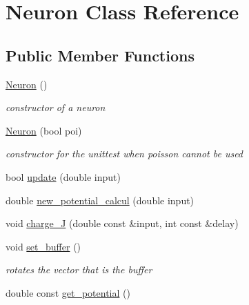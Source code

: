 \hypertarget{class_neuron}{}\section{Neuron Class Reference}
\label{class_neuron}
\subsection*{Public Member Functions}
\begin{DoxyCompactItemize}
\item 
\mbox{\label{class_neuron_a823487d01615fadb8ac19a2768dd9d96}} 
\hyperlink{class_neuron_a823487d01615fadb8ac19a2768dd9d96}{Neuron} ()
\begin{DoxyCompactList}\small\item\em constructor of a neuron \end{DoxyCompactList}\item 
\mbox{\label{class_neuron_a9c2598da8cb0361e9499e070a19a8d42}} 
\hyperlink{class_neuron_a9c2598da8cb0361e9499e070a19a8d42}{Neuron} (bool poi)
\begin{DoxyCompactList}\small\item\em constructor for the unittest when poisson cannot be used \end{DoxyCompactList}\item 
bool \hyperlink{class_neuron_abad446d547800d3ba15a2da374fe409e}{update} (double input)
\item 
double \hyperlink{class_neuron_a689b33332f090aab40360f53c8bcfac6}{new\+\_\+potential\+\_\+calcul} (double input)
\item 
void \hyperlink{class_neuron_abfc4d63f88dd429dbd0d9dd379e232a0}{charge\+\_\+J} (double const \&input, int const \&delay)
\item 
\mbox{\label{class_neuron_a6432f7cc92b4c6ccb6321eac1caefd70}} 
void \hyperlink{class_neuron_a6432f7cc92b4c6ccb6321eac1caefd70}{set\+\_\+buffer} ()
\begin{DoxyCompactList}\small\item\em rotates the vector that is the buffer \end{DoxyCompactList}\item 
double const \hyperlink{class_neuron_a96dcaec2f9146dedd3f926d35b2c08f4}{get\+\_\+potential} ()
\end{DoxyCompactItemize}
